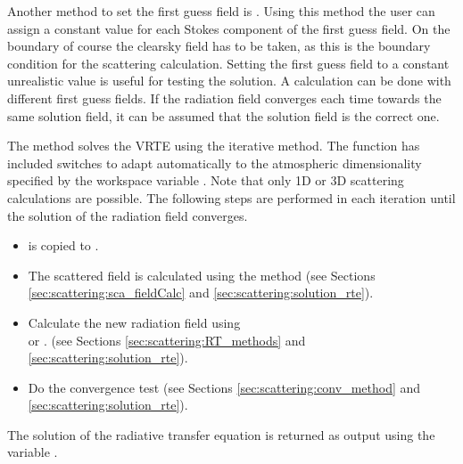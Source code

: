 \vspace*{1ex}
Another method to set the first guess field is . Using this method the user can assign a constant value for each Stokes component of the first guess field. On the boundary of course the clearsky field has to be taken, as this is the boundary condition for the scattering calculation.
Setting the first guess field to a constant unrealistic value is useful for testing the solution. A calculation can be done with different first guess fields. If the radiation field converges each time towards the same solution field, it can be assumed that the solution field is the correct one.


The method  solves the VRTE using the
iterative method.  The function has
included switches to adapt automatically to the atmospheric
dimensionality specified
by the workspace variable . Note that only
1D or 3D scattering calculations are possible. 
The following steps are performed in each iteration until the solution
of the radiation field converges.

\begin{itemize}
\item {} is copied to .
\item The scattered field is calculated using the method
    (see Sections \ref{sec:scattering:sca_fieldCalc} and
    \ref{sec:scattering:solution_rte}).
\item Calculate the new radiation field using\\
   or .
 (see Sections \ref{sec:scattering:RT_methods} and
  \ref{sec:scattering:solution_rte}).
\item Do the convergence test (see Sections
  \ref{sec:scattering:conv_method} and \ref{sec:scattering:solution_rte}).
\end{itemize}
The solution of the radiative transfer equation is returned as output
using the variable . 


